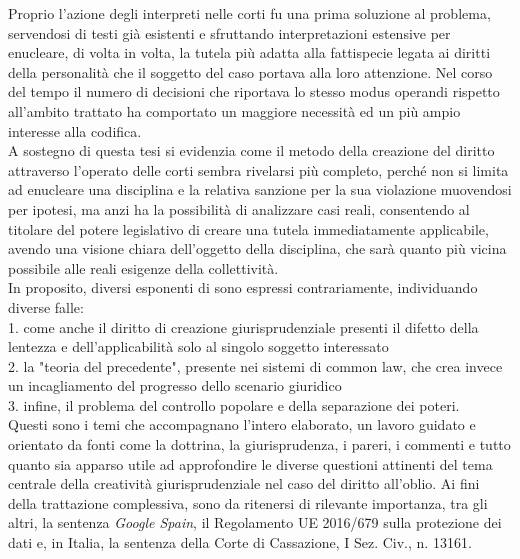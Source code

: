 Proprio l'azione degli interpreti nelle corti fu una prima soluzione al problema, servendosi di testi già esistenti e sfruttando interpretazioni estensive per enucleare, di volta in volta, la tutela più adatta alla fattispecie legata ai diritti della personalità che il soggetto del caso portava alla loro attenzione.
Nel corso del tempo il numero di decisioni che riportava lo stesso modus operandi rispetto all’ambito trattato ha comportato un maggiore necessità ed un più ampio interesse alla codifica.
\\A sostegno di questa tesi si evidenzia come il metodo della creazione del diritto attraverso l'operato delle corti sembra rivelarsi più completo, perché non si limita ad enucleare una disciplina e la relativa sanzione per la sua violazione muovendosi per ipotesi, ma anzi ha la possibilità di analizzare casi reali, consentendo al titolare del potere legislativo di creare una tutela immediatamente applicabile, avendo una visione chiara dell'oggetto della disciplina, che sarà quanto più vicina possibile alle reali esigenze della collettività.
\\In proposito, diversi esponenti di sono espressi contrariamente, individuando diverse falle: 
\\1. come anche il diritto di creazione giurisprudenziale presenti il difetto della lentezza e dell'applicabilità solo al singolo soggetto interessato
\\2. la "teoria del precedente", presente nei sistemi di common law, che crea invece un incagliamento del progresso dello scenario giuridico
\\3. infine, il problema del controllo popolare e della separazione dei poteri.
\\Questi sono i temi che accompagnano l'intero elaborato, un lavoro guidato e orientato da fonti come la dottrina, la giurisprudenza, i pareri, i commenti e tutto quanto sia apparso utile ad approfondire le diverse questioni attinenti del tema centrale della creatività giurisprudenziale nel caso del diritto all'oblio.
Ai fini della trattazione complessiva, sono da ritenersi di rilevante importanza, tra gli altri, la sentenza \textit{Google Spain}, il Regolamento UE 2016/679 sulla protezione dei dati e, in Italia, la sentenza della Corte di Cassazione, I Sez. Civ., n. 13161.


















































